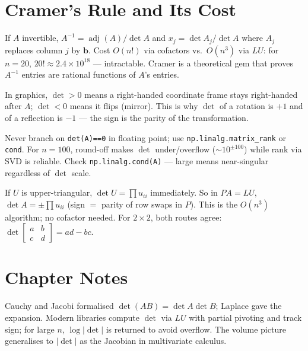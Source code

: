 \section{Cramer's Rule and Its Cost}
\label{sec:cramer-detail}
If $A$ invertible, $A^{-1}=\operatorname{adj}(A)/\det A$ and $x_j=\det A_j/\det A$ where $A_j$ replaces column $j$ by $\mathbf{b}$. Cost $O(n!)$ via cofactors vs.\ $O(n^3)$ via $LU$: for $n=20$, $20!\approx2.4\times10^{18}$ --- intractable. Cramer is a theoretical gem that proves $A^{-1}$ entries are rational functions of $A$'s entries.



\begin{remark}
In graphics, $\det>0$ means a right-handed coordinate frame stays right-handed after $A$; $\det<0$ means it flips (mirror). This is why $\det$ of a rotation is $+1$ and of a reflection is $-1$ --- the sign is the parity of the transformation.
\end{remark}

\begin{example}
Never branch on \texttt{det(A)==0} in floating point; use \texttt{np.linalg.matrix\_rank} or \texttt{cond}. For $n=100$, round-off makes $\det$ under/overflow ($\sim10^{\pm100}$) while rank via SVD is reliable. Check \texttt{np.linalg.cond(A)} --- large means near-singular regardless of $\det$ scale.
\end{example}



\begin{example}
If $U$ is upper-triangular, $\det U=\prod u_{ii}$ immediately. So in $PA=LU$, $\det A=\pm\prod u_{ii}$ (sign $=$ parity of row swaps in $P$). This is the $O(n^3)$ algorithm; no cofactor needed. For $2\times2$, both routes agree: $\det\begin{bmatrix}a&b\\c&d\end{bmatrix}=ad-bc$.
\end{example}


\section{Chapter Notes}
Cauchy and Jacobi formalised $\det(AB)=\det A\det B$; Laplace gave the expansion. Modern libraries compute $\det$ via $LU$ with partial pivoting and track sign; for large $n$, $\log|\det|$ is returned to avoid overflow. The volume picture generalises to $|\det|$ as the Jacobian in multivariate calculus.

